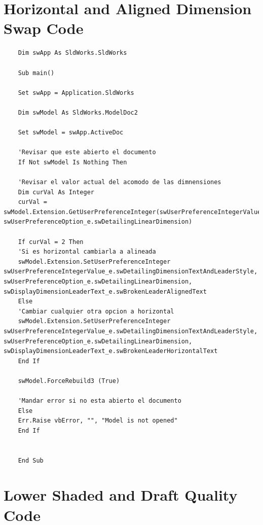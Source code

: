 \documentclass[12pt,letterpaper,final]{report}
\begin{document}
\chapter{Horizontal and Aligned Dimension Swap Code}

\begin{lstlisting}
	Dim swApp As SldWorks.SldWorks
	
	Sub main()
	
	Set swApp = Application.SldWorks
	
	Dim swModel As SldWorks.ModelDoc2
	
	Set swModel = swApp.ActiveDoc
	
	'Revisar que este abierto el documento
	If Not swModel Is Nothing Then
	
	'Revisar el valor actual del acomodo de las dimnensiones
	Dim curVal As Integer
	curVal = swModel.Extension.GetUserPreferenceInteger(swUserPreferenceIntegerValue_e.swDetailingDimensionTextAndLeaderStyle, swUserPreferenceOption_e.swDetailingLinearDimension)
	
	If curVal = 2 Then
	'Si es horizontal cambiarla a alineada
	swModel.Extension.SetUserPreferenceInteger swUserPreferenceIntegerValue_e.swDetailingDimensionTextAndLeaderStyle, swUserPreferenceOption_e.swDetailingLinearDimension, swDisplayDimensionLeaderText_e.swBrokenLeaderAlignedText
	Else
	'Cambiar cualquier otra opcion a horizontal
	swModel.Extension.SetUserPreferenceInteger swUserPreferenceIntegerValue_e.swDetailingDimensionTextAndLeaderStyle, swUserPreferenceOption_e.swDetailingLinearDimension, swDisplayDimensionLeaderText_e.swBrokenLeaderHorizontalText
	End If
	
	swModel.ForceRebuild3 (True)
	
	'Mandar error si no esta abierto el documento
	Else
	Err.Raise vbError, "", "Model is not opened"
	End If
	
	
	End Sub
\end{lstlisting}

\chapter{Lower Shaded and Draft Quality Code}
\end{document}

